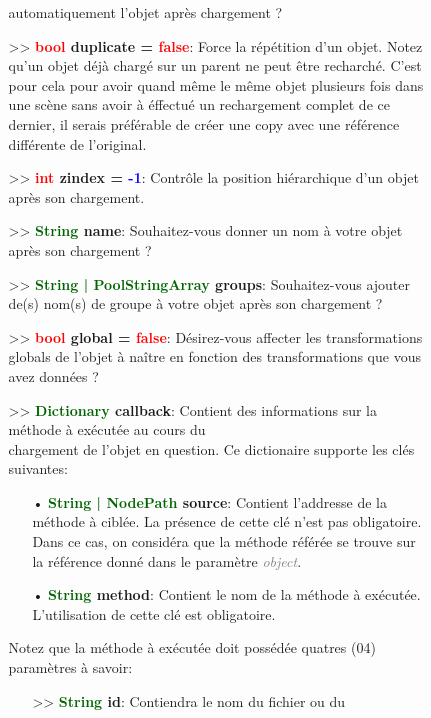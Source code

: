 \documentclass[a4paper, 11pt]{article}
\begin{document}
\begin{description}
\begin{itemize}
\begin{itemize}
				automatiquement l'objet après chargement ?
				\item[>> \textbf{\textcolor{red}{bool} duplicate = \textcolor{red}{false}}:] Force la 
				répétition d'un objet. Notez qu'un objet déjà chargé sur un parent ne peut être recharché.
				C'est pour cela pour avoir quand même le même objet plusieurs fois dans une scène sans avoir
				à éffectué un rechargement complet de ce dernier, il serais préférable de créer une copy
				avec une référence différente de l'original.
				\item[>> \textbf{\textcolor{red}{int} zindex = \textcolor{blue}{-1}}:] Contrôle la position
				hiérarchique d'un objet après son chargement.
				\item[>> \textbf{\textcolor{darkgreen}{String} name}:] Souhaitez-vous donner un nom à votre
				objet après son chargement ?
				\item[>> \textbf{\textcolor{darkgreen}{String | PoolStringArray} groups}:] Souhaitez-vous 
				ajouter de(s) nom(s) de groupe à votre objet après son chargement ?
				\item[>> \textbf{\textcolor{red}{bool} global = \textcolor{red}{false}}:] Désirez-vous 
				affecter les transformations globals de l'objet à naître en fonction des transformations que 
				vous avez données ?
				\item [>> \textbf{\textcolor{darkgreen}{Dictionary} callback}:] Contient des informations 
				sur la méthode à exécutée au cours du \\chargement de l'objet en question. Ce dictionaire
				supporte les clés suivantes:
			    \begin{itemize}
			       \item[• \textbf{\textcolor{darkgreen}{String | NodePath} source}:] Contient l'addresse de 
			       la méthode à ciblée. La présence de cette clé n'est pas obligatoire. Dans ce cas, on
			       considéra que la méthode référée se trouve sur la référence donné dans le paramètre
			       \textit{\textcolor{gray}{object}}.
			       \item[• \textbf{\textcolor{darkgreen}{String} method}:] Contient le nom de la méthode à 
			       exécutée. L'utilisation de cette clé est obligatoire.
			   \end{itemize}
				Notez que la méthode à exécutée doit possédée quatres (04) paramètres à savoir:
				\begin{itemize}
					\item [>> \textbf{\textcolor{darkgreen}{String} id}:] Contiendra le nom du fichier ou du

\end{itemize}
\end{itemize}
\end{itemize}
\end{description}
\end{document}
